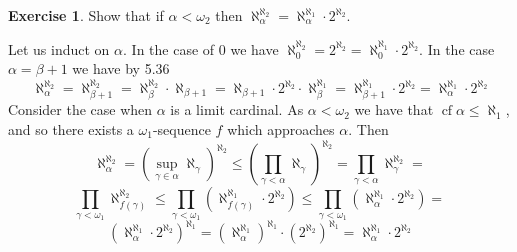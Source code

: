 \documentclass{article}
\theoremstyle{definition}
\newtheorem{exer}{Exercise}[section]
\DeclareMathOperator{\cf}{cf}
\newlength{\defparindent}
\newenvironment{answer}
    {\begin{mdframed}[backgroundcolor=gray!15, linewidth=0pt] \setlength{\parindent}{\defparindent}}
    {\end{mdframed}}
\begin{document}
\begin{exer}
    Show that if $\alpha < \omega_2$ then $\aleph_{\alpha}^{\aleph_2} = \aleph_{\alpha}^{\aleph_1} \cdot 2^{\aleph_2}$.
    \begin{answer}
        Let us induct on $\alpha$. In the case of $0$ we have $\aleph_{0}^{\aleph_2} = 2^{\aleph_2} = \aleph_{0}^{\aleph_1} \cdot 2^{\aleph_2}$. In the case $\alpha = \beta + 1$ we have by 5.36 
        \[
            \aleph_{\alpha}^{\aleph_2} 
            =
            \aleph_{\beta + 1}^{\aleph_2} 
            =
            \aleph_{\beta}^{\aleph_2} \cdot \aleph_{\beta + 1}
            =
            \aleph_{\beta + 1} \cdot 2^{\aleph_2} \cdot \aleph_{\beta}^{\aleph_1}
            =
            \aleph_{\beta + 1}^{\aleph_1} \cdot 2^{\aleph_2} 
            =
            \aleph_{\alpha}^{\aleph_1} \cdot 2^{\aleph_2}
        \]
        Consider the case when $\alpha$ is a limit cardinal. As $\alpha < \omega_2$ we have that $\cf \alpha \le \aleph_1$, and so there exists a $\omega_1$-sequence $f$ which approaches $\alpha$. Then
        \[
            \aleph_{\alpha}^{\aleph_2} = 
            (\sup_{\gamma \in \alpha} \aleph_\gamma)^{\aleph_2}
            \le
            (\prod_{\gamma < \alpha} \aleph_\gamma)^{\aleph_2}
            = 
            \prod_{\gamma < \alpha} \aleph_{\gamma}^{\aleph_2}
            = 
        \]
        \[
            \prod_{\gamma < \omega_1} \aleph_{f(\gamma)}^{\aleph_2}
            \le 
            \prod_{\gamma < \omega_1} (\aleph_{f(\gamma)}^{\aleph_1} \cdot 2^{\aleph_2})
            \le
            \prod_{\gamma < \omega_1} (\aleph_{\alpha}^{\aleph_1} \cdot 2^{\aleph_2})
            =
        \]
        \[ 
            (\aleph_{\alpha}^{\aleph_1} \cdot 2^{\aleph_2})^{\aleph_1}
            =
            (\aleph_{\alpha}^{\aleph_1})^{\aleph_1} \cdot (2^{\aleph_2})^{\aleph_1}
            =
            \aleph_{\alpha}^{\aleph_1} \cdot 2^{\aleph_2}
        \]
    \end{answer}
\end{exer}
\end{document}
